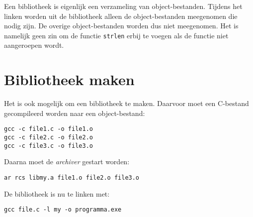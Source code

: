 Een bibliotheek is eigenlijk een verzameling van object-bestanden. Tijdens het linken worden uit de bibliotheek alleen de object-bestanden meegenomen die nodig zijn. De overige object-bestanden worden dus niet meegenomen. Het is namelijk geen zin om de functie \texttt{strlen} erbij te voegen als de functie niet aangeroepen wordt.


\section{Bibliotheek maken}
Het is ook mogelijk om een bibliotheek te maken. Daarvoor moet een C-bestand gecompileerd worden naar een object-bestand:

\hspace*{1em}\texttt{gcc -c file1.c -o file1.o}\\
\hspace*{1em}\texttt{gcc -c file2.c -o file2.o}\\
\hspace*{1em}\texttt{gcc -c file3.c -o file3.o}

Daarna moet de \textsl{archiver} gestart worden:

\hspace*{1em}\texttt{ar rcs libmy.a file1.o file2.o file3.o}

De bibliotheek is nu te linken met:

\hspace*{1em}\texttt{gcc file.c -l my -o programma.exe}


%
%
%
%    
%    
%
